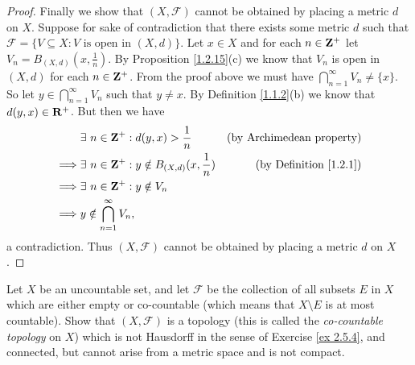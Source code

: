 \begin{proof}
    Finally we show that \((X, \mathcal{F})\) cannot be obtained by placing a metric \(d\) on \(X\).
    Suppose for sake of contradiction that there exists some metric \(d\) such that \(\mathcal{F} = \{V \subseteq X : V \text{ is open in } (X, d)\}\).
    Let \(x \in X\) and for each \(n \in \mathbf{Z}^+\) let \(V_n = B_{(X, d)}(x, \frac{1}{n})\).
    By Proposition \ref{1.2.15}(c) we know that \(V_n\) is open in \((X, d)\) for each \(n \in \mathbf{Z}^+\).
    From the proof above we must have \(\bigcap_{n = 1}^\infty V_n \neq \{x\}\).
    So let \(y \in \bigcap_{n = 1}^\infty V_n\) such that \(y \neq x\).
    By Definition \ref{1.1.2}(b) we know that \(d(y, x) \in \mathbf{R}^+\).
    But then we have
    \begin{align*}
                 & \exists\ n \in \mathbf{Z}^+ : d(y, x) > \frac{1}{n}               & \text{(by Archimedean property)}   \\
        \implies & \exists\ n \in \mathbf{Z}^+ : y \notin B_{(X, d)}(x, \frac{1}{n}) & \text{(by Definition \ref{1.2.1})} \\
        \implies & \exists\ n \in \mathbf{Z}^+ : y \notin V_n                                                             \\
        \implies & y \notin \bigcap_{n = 1}^\infty V_n,
    \end{align*}
    a contradiction.
    Thus \((X, \mathcal{F})\) cannot be obtained by placing a metric \(d\) on \(X\).
\end{proof}

\begin{exercise}\label{ex 2.5.7}
    Let \(X\) be an uncountable set, and let \(\mathcal{F}\) be the collection of all subsets \(E\) in \(X\) which are either empty or co-countable
    (which means that \(X \setminus E\) is at most countable).
    Show that \((X, \mathcal{F})\) is a topology (this is called the \emph{co-countable topology} on \(X\)) which is not Hausdorff in the sense of Exercise \ref{ex 2.5.4}, and connected, but cannot arise from a metric space and is not compact.
\end{exercise}


